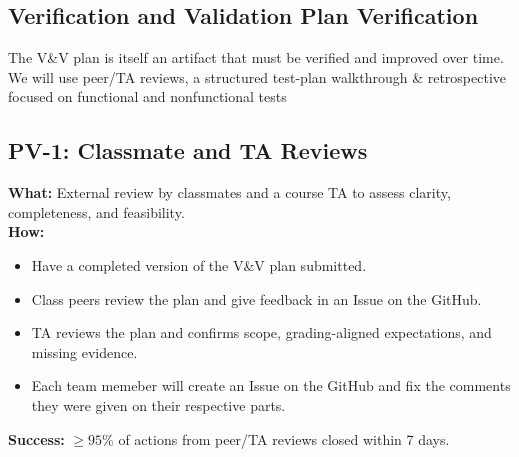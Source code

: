 \documentclass[12pt, titlepage]{article}
\begin{document}
\subsection{Verification and Validation Plan Verification}

The V\&V plan is itself an artifact that must be verified and improved over time. We will use
peer/TA reviews, a structured test-plan walkthrough \& retrospective focused on functional and nonfunctional tests

\subsection*{PV-1: Classmate and TA Reviews}
\textbf{What:} External review by classmates and a course TA to assess clarity, completeness, and feasibility. \\
\textbf{How:}
\begin{itemize}
  \item Have a completed version of the V\&V plan submitted.
  \item Class peers review the plan and give feedback in an Issue on the GitHub.
  \item TA reviews the plan and confirms scope, grading-aligned expectations, and missing evidence.
  \item Each team memeber will create an Issue on the GitHub and fix the comments they were given on their respective parts.
\end{itemize}
\textbf{Success:} $\geq 95\%$ of actions from peer/TA reviews closed within 7 days.
\end{document}
